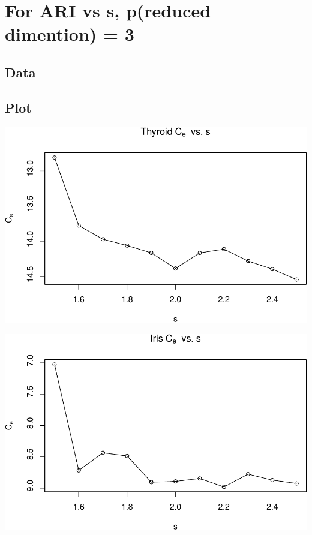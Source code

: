 \documentclass[]{article}
\begin{document}
\section{For ARI vs s, p(reduced dimention) =
3}\label{for-ari-vs-s-preduced-dimention-3}

\subsection{Data}\label{data-3}

\subsection{Plot}\label{plot-3}

\begin{center}\includegraphics[width=1\linewidth]{Report_files/figure-latex/unnamed-chunk-26-1} \end{center}

\begin{center}\includegraphics[width=1\linewidth]{Report_files/figure-latex/unnamed-chunk-26-2} \end{center}
\end{document}

